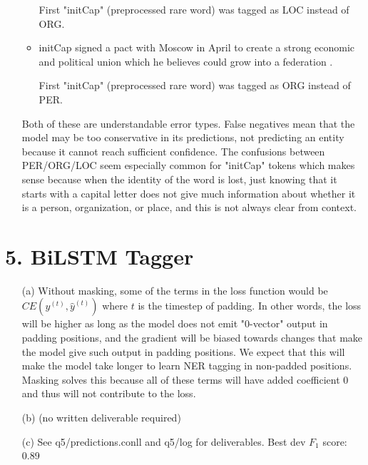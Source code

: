 \documentclass{article}
\begin{document}
\begin{itemize}
\begin{itemize}
        First "initCap" (preprocessed rare word) was tagged as LOC instead of ORG.

        \item initCap signed a pact with Moscow in April to create a strong economic and political union which he believes could grow into a federation .
        
        First "initCap" (preprocessed rare word) was tagged as ORG instead of PER.
    \end{itemize}

    Both of these are understandable error types. False negatives mean that the model may be too conservative in its predictions, not predicting an entity because it cannot reach sufficient confidence. The confusions between PER/ORG/LOC seem especially common for "initCap" tokens which makes sense because when the identity of the word is lost, just knowing that it starts with a capital letter does not give much information about whether it is a person, organization, or place, and this is not always clear from context.

\end{itemize}

\section*{5. BiLSTM Tagger}

\begin{itemize}
    \item[(a)] Without masking, some of the terms in the loss function would be $CE(y^{(t)}, \hat{y}^{(t)})$ where $t$ is the timestep of padding. In other words, the loss will be higher as long as the model does not emit "0-vector" output in padding positions, and the gradient will be biased towards changes that make the model give such output in padding positions. We expect that this will make the model take longer to learn NER tagging in non-padded positions. Masking solves this because all of these terms will have added coefficient $0$ and thus will not contribute to the loss.
    \item[(b)] (no written deliverable required)
    \item[(c)] See q5/predictions.conll and q5/log for deliverables. Best dev $F_1$ score: 0.89
\end{itemize}
\end{document}
